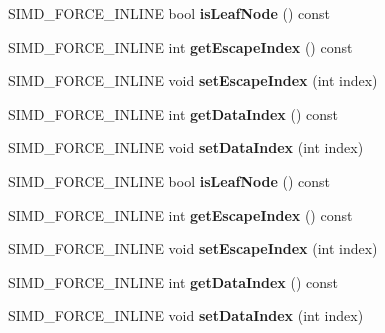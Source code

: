\begin{DoxyCompactItemize}
\item 
\mbox{\label{classGIM__BVH__TREE__NODE_a1a30e16de844ae23d15dc6d19a6285f9}} 
S\+I\+M\+D\+\_\+\+F\+O\+R\+C\+E\+\_\+\+I\+N\+L\+I\+NE bool {\bfseries is\+Leaf\+Node} () const
\item 
\mbox{\label{classGIM__BVH__TREE__NODE_a4d4765f0627d4474e81fdf4486469af5}} 
S\+I\+M\+D\+\_\+\+F\+O\+R\+C\+E\+\_\+\+I\+N\+L\+I\+NE int {\bfseries get\+Escape\+Index} () const
\item 
\mbox{\label{classGIM__BVH__TREE__NODE_af6939dcb5f2a0cb3d7440cfb68449369}} 
S\+I\+M\+D\+\_\+\+F\+O\+R\+C\+E\+\_\+\+I\+N\+L\+I\+NE void {\bfseries set\+Escape\+Index} (int index)
\item 
\mbox{\label{classGIM__BVH__TREE__NODE_aa5ecf78b0c4df1bee026ea39db1b028a}} 
S\+I\+M\+D\+\_\+\+F\+O\+R\+C\+E\+\_\+\+I\+N\+L\+I\+NE int {\bfseries get\+Data\+Index} () const
\item 
\mbox{\label{classGIM__BVH__TREE__NODE_a38cbb23bb5f8939b936af9245b09661c}} 
S\+I\+M\+D\+\_\+\+F\+O\+R\+C\+E\+\_\+\+I\+N\+L\+I\+NE void {\bfseries set\+Data\+Index} (int index)
\item 
\mbox{\label{classGIM__BVH__TREE__NODE_a1a30e16de844ae23d15dc6d19a6285f9}} 
S\+I\+M\+D\+\_\+\+F\+O\+R\+C\+E\+\_\+\+I\+N\+L\+I\+NE bool {\bfseries is\+Leaf\+Node} () const
\item 
\mbox{\label{classGIM__BVH__TREE__NODE_a4d4765f0627d4474e81fdf4486469af5}} 
S\+I\+M\+D\+\_\+\+F\+O\+R\+C\+E\+\_\+\+I\+N\+L\+I\+NE int {\bfseries get\+Escape\+Index} () const
\item 
\mbox{\label{classGIM__BVH__TREE__NODE_af6939dcb5f2a0cb3d7440cfb68449369}} 
S\+I\+M\+D\+\_\+\+F\+O\+R\+C\+E\+\_\+\+I\+N\+L\+I\+NE void {\bfseries set\+Escape\+Index} (int index)
\item 
\mbox{\label{classGIM__BVH__TREE__NODE_aa5ecf78b0c4df1bee026ea39db1b028a}} 
S\+I\+M\+D\+\_\+\+F\+O\+R\+C\+E\+\_\+\+I\+N\+L\+I\+NE int {\bfseries get\+Data\+Index} () const
\item 
\mbox{\label{classGIM__BVH__TREE__NODE_a38cbb23bb5f8939b936af9245b09661c}} 
S\+I\+M\+D\+\_\+\+F\+O\+R\+C\+E\+\_\+\+I\+N\+L\+I\+NE void {\bfseries set\+Data\+Index} (int index)
\end{DoxyCompactItemize}
